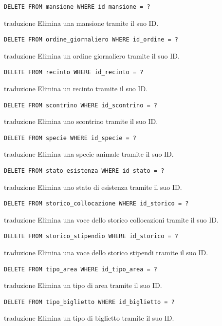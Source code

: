 \documentclass[12pt,a4paper]{report}
\begin{document}
\begin{lstlisting}[style=sqlstyle]
DELETE FROM mansione WHERE id_mansione = ?
\end{lstlisting}
traduzione {Elimina una mansione tramite il suo ID.}

\begin{lstlisting}[style=sqlstyle]
DELETE FROM ordine_giornaliero WHERE id_ordine = ?
\end{lstlisting}
traduzione {Elimina un ordine giornaliero tramite il suo ID.}

\begin{lstlisting}[style=sqlstyle]
DELETE FROM recinto WHERE id_recinto = ?
\end{lstlisting}
traduzione {Elimina un recinto tramite il suo ID.}

\begin{lstlisting}[style=sqlstyle]
DELETE FROM scontrino WHERE id_scontrino = ?
\end{lstlisting}
traduzione {Elimina uno scontrino tramite il suo ID.}

\begin{lstlisting}[style=sqlstyle]
DELETE FROM specie WHERE id_specie = ?
\end{lstlisting}
traduzione {Elimina una specie animale tramite il suo ID.}

\begin{lstlisting}[style=sqlstyle]
DELETE FROM stato_esistenza WHERE id_stato = ?
\end{lstlisting}
traduzione {Elimina uno stato di esistenza tramite il suo ID.}

\begin{lstlisting}[style=sqlstyle]
DELETE FROM storico_collocazione WHERE id_storico = ?
\end{lstlisting}
traduzione {Elimina una voce dello storico collocazioni tramite il suo ID.}

\begin{lstlisting}[style=sqlstyle]
DELETE FROM storico_stipendio WHERE id_storico = ?
\end{lstlisting}
traduzione {Elimina una voce dello storico stipendi tramite il suo ID.}

\begin{lstlisting}[style=sqlstyle]
DELETE FROM tipo_area WHERE id_tipo_area = ?
\end{lstlisting}
traduzione {Elimina un tipo di area tramite il suo ID.}

\begin{lstlisting}[style=sqlstyle]
DELETE FROM tipo_biglietto WHERE id_biglietto = ?
\end{lstlisting}
traduzione {Elimina un tipo di biglietto tramite il suo ID.}
\end{document}
